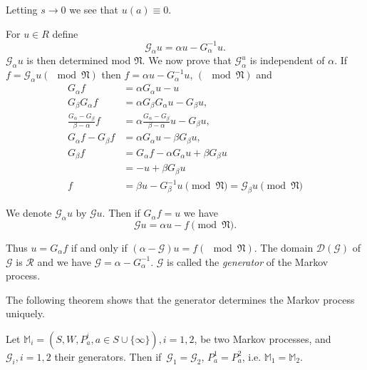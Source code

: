 Letting $s \to 0$ we see that $u(a)  \equiv 0$.

For $u \in R$ define
$$
\mathscr{G}_\alpha u = \alpha u - G^{-1}_\alpha u.
$$ 
$\mathscr{G}_\alpha u$ is then determined mod $\mathfrak{N}$. We now
prove that $\mathscr{G}_\alpha^u$ is independent of $\alpha$. If $f=
\mathscr{G}_\alpha  u (\mod \mathfrak{N})$ then $f= \alpha u -
G^{-1}_\alpha u$, $(\mod \mathfrak{N})$ and    
\begin{align*}
  G_\alpha f & = \alpha G_\alpha u-u \\
  G_\beta G_\alpha f & = \alpha G_\beta G_\alpha u- G_\beta u, \\
  \frac{G_\alpha - G_\beta}{\beta - \alpha} f &= \alpha \frac{G_\alpha
    - G_\beta}{\beta - \alpha} u - G_\beta u, \\ 
  G_\alpha f-  G_\beta f &= \alpha G_\alpha u - \beta G_\beta u, \\
  G_\beta f &= G_\alpha f - \alpha G_\alpha u+ \beta G_\beta u\\
  &= - u + \beta G_\beta u \\
  f &= \beta u - G^{-1}_\beta u \pmod {\mathfrak{N}} =
  \mathscr{G}_\beta u  \pmod {\mathfrak{N}} 
\end{align*}\pageoriginale

We denote $\mathscr{G}_\alpha u$ by $\mathscr{G} u$. Then if $G_\alpha
f=u $ we have  
$$
\mathscr{G}u = \alpha u-f \pmod{\mathfrak{N}}.
$$

Thus $u= G_\alpha f$ if and only if $( \alpha - \mathscr{G}) u  =f
(\mod \mathfrak{N})$. The domain $\mathscr{D} (\mathscr{G})$ of
$\mathscr{G}$ is $\mathscr{R}$ and we have $\mathscr{G}= \alpha -
G^{-1}_ \alpha$. $\mathscr{G}$ is called the \textit{generator} of the
Markov process. 

The following theorem shows that the generator determines the Mar\-kov
process uniquely. 
\begin{theorem*}
  Let $\mathbb{M}_i = (S, W, P^i_a, a  \in  S \cup \{  \infty\}), i =
  1,2$, be two Markov processes, and $\mathscr{G}_i , i=1,2$ their
  generators. Then if\ $\mathscr{G}_1 = \mathscr{G}_2$, $P^1_a =
  P^2_a$, i.e. $\mathbb{M}_1 = \mathbb{M}_2$. 
\end{theorem*}

